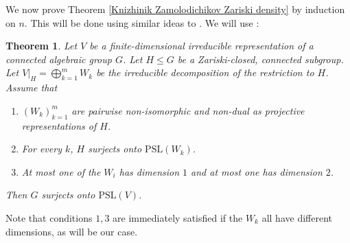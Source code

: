 \documentclass[letterpaper]{amsart}
\newtheorem{theorem}{Theorem}[section]
\begin{document}
We now prove Theorem \ref{Knizhinik Zamolodichikov Zariski density} by induction on $n.$ This will be done using similar ideas to \cite{kuperberg2018tqft}. We will use \cite[Theorem 7.4]{kuperberg2018tqft}:
\begin{theorem}
\label{lie algebra amplification}
    Let $V$ be a finite-dimensional irreducible representation of a connected algebraic group $G$. Let $H \leq G$ be a Zariski-closed, connected subgroup. Let $V|_H = \bigoplus_{k=1}^m W_k$ be the irreducible decomposition of the restriction to $H$. Assume that
    \begin{enumerate}
        \item $(W_k)_{k=1}^m$ are pairwise non-isomorphic and non-dual as projective representations of $H$.
        \item For every $k$, $H$ surjects onto $\mathrm{PSL}(W_k)$.
        \item At most one of the $W_i$ has dimension $1$ and at most one has dimension $2$.
    \end{enumerate}
Then $G$ surjects onto $\mathrm{PSL}(V)$.
\end{theorem}
Note that conditions $1, 3$ are immediately satisfied if the $W_k$ all have different dimensions, as will be our case.
\end{document}
